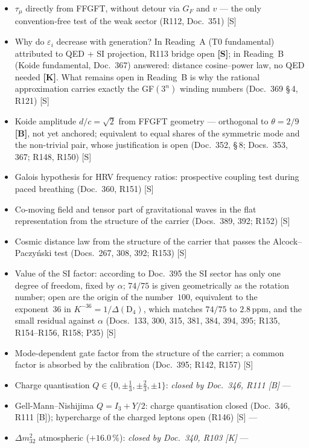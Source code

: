 \begin{itemize}\itemsep2pt
  \item $\tau_\mu$ directly from FFGFT, without detour via $G_F$ and $v$ --- the only convention-free test of the weak sector (R112, Doc.~351) [S]
  \item Why do $\varepsilon_i$ decrease with generation? In Reading~A (T0 fundamental) attributed to QED + SI projection, R113 bridge open \textbf{[S]}; in Reading~B (Koide fundamental, Doc.~367) answered: distance cosine--power law, no QED needed \textbf{[K]}. What remains open in Reading~B is why the rational approximation carries exactly the GF$(3^n)$ winding numbers (Doc.~369 §\,4, R121) [S]
  \item Koide amplitude $d/c=\sqrt{2}$ from FFGFT geometry --- orthogonal to $\theta=2/9$ \textbf{[B]}, not yet anchored; equivalent to equal shares of the symmetric mode and the non-trivial pair, whose justification is open (Doc.~352, §\,8; Docs.~353, 367; R148, R150) [S]
  \item Galois hypothesis for HRV frequency ratios: prospective coupling test during paced breathing (Doc.~360, R151) [S]
  \item Co-moving field and tensor part of gravitational waves in the flat representation from the structure of the carrier (Docs.~389, 392; R152) [S]
  \item Cosmic distance law from the structure of the carrier that passes the Alcock--Paczyński test (Docs.~267, 308, 392; R153) [S]
  \item Value of the SI factor: according to Doc.~395 the SI sector has only one degree of freedom, fixed by $\alpha$; $74/75$ is given geometrically as the rotation number; open are the origin of the number~$100$, equivalent to the exponent~36 in $K^{-36}=1/\Delta(\mathrm{D}_4)$, which matches $74/75$ to $2.8$\,ppm, and the small residual against $\alpha$ (Docs.~133, 300, 315, 381, 384, 394, 395; R135, R154--R156, R158; P35) [S]
  \item Mode-dependent gate factor from the structure of the carrier; a common factor is absorbed by the calibration (Doc.~395; R142, R157) [S]
  \item Charge quantisation $Q\in\{0,\pm\tfrac{1}{3},\pm\tfrac{2}{3},\pm1\}$: \emph{closed by Doc.~346, R111 [B]} ---
  \item Gell-Mann--Nishijima $Q=I_3+Y/2$: charge quantisation closed (Doc.~346, R111 [B]); hypercharge of the charged leptons open (R146) [S] ---
  \item $\Delta m_{32}^2$ atmospheric ($+16.0\,\%$): \emph{closed by Doc.~340, R103 [K]} ---

\end{itemize}
